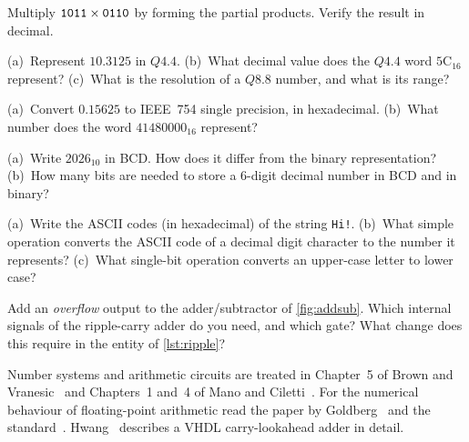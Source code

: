 \begin{exlist}
  \item Multiply $\mathtt{1011}\times\mathtt{0110}$ by forming the partial products. Verify the result in decimal.
  \item (a)~Represent $10.3125$ in $Q4.4$. (b)~What decimal value does the $Q4.4$ word $\mathrm{5C}_{16}$ represent? (c)~What is the resolution of a $Q8.8$ number, and what is its range?
  \item (a)~Convert $0.15625$ to IEEE~754 single precision, in hexadecimal. (b)~What number does the word $\mathrm{41480000}_{16}$ represent?
  \item (a)~Write $2026_{10}$ in BCD. How does it differ from the binary representation? (b)~How many bits are needed to store a 6-digit decimal number in BCD and in binary?
  \item (a)~Write the ASCII codes (in hexadecimal) of the string \texttt{Hi!}. (b)~What simple operation converts the ASCII code of a decimal digit character to the number it represents? (c)~What single-bit operation converts an upper-case letter to lower case?
  \item Add an \emph{overflow} output to the adder/subtractor of \cref{fig:addsub}. Which internal signals of the ripple-carry adder do you need, and which gate? What change does this require in the entity  of \cref{lst:ripple}?
\end{exlist}

Number systems and arithmetic circuits are treated in Chapter~5 of Brown and Vranesic~\cite{brown2009} and Chapters~1 and~4 of Mano and Ciletti~\cite{mano2018}. For the numerical behaviour of floating-point arithmetic read the paper by Goldberg~\cite{goldberg1991} and the standard~\cite{ieee754}. Hwang~\cite{hwang2005} describes a VHDL carry-lookahead adder in detail.
